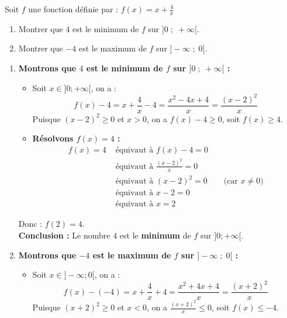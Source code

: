 \documentclass[10pt, a4paper]{article}
\begin{document}
\begin{Application}[][30 min]
Soit $f$ une fonction définie par : \quad $f(x) = x + \frac{4}{x}$
\begin{enumerate}[leftmargin=*,itemsep=0.5pt]
    \item Montrer que $4$ est le minimum de $f$ sur $\big]0 \;;\; +\infty\big[$.
    \item Montrer que $-4$ est le maximum de $f$ sur $\big]-\infty \;;\; 0\big[$.
\end{enumerate}
\end{Application}

\begin{Solution}[APPLICATION][15]
\begin{enumerate}[leftmargin=*,itemsep=1pt]
    \item \textbf{Montrons que $4$ est le minimum de $f$ sur $\big]0 \;;\; +\infty\big[$ :}

    \begin{itemize}[leftmargin=*,itemsep=1pt]
        \item Soit $x \in \big]0 ; +\infty\big[$, on a :
        $$f(x) - 4 = x + \frac{4}{x} - 4 
                 = \frac{x^2 - 4x + 4}{x} 
                 = \frac{(x - 2)^2}{x}$$
    Puisque $(x-2)^2 \geq 0$ et $x > 0$, on a $f(x) - 4 \geq 0$, soit $f(x) \geq 4$.

        \item \textbf{Résolvons $f(x) = 4$ :}
        \begin{align*}
            f(x) = 4
            &\text{ équivaut à } f(x) - 4 = 0 \\
            &\text{ équivaut à } \frac{(x - 2)^2}{x} = 0 \\
            &\text{ équivaut à } (x - 2)^2 = 0 \qquad \text{(car $x \neq 0$)} \\
            &\text{ équivaut à } x - 2 = 0 \\
            &\text{ équivaut à } x = 2
        \end{align*}
    \end{itemize}
    Donc : $f(2) = 4$. \\
    \textbf{Conclusion :} Le nombre $4$ est le \textbf{minimum} de $f$ sur $\big]0 ; +\infty\big[$.

    \item \textbf{Montrons que $-4$ est le maximum de $f$ sur $\big]-\infty \;;\; 0\big[$ :}

    

    \begin{itemize}[leftmargin=*,itemsep=0.5pt]
        \item Soit $x \in \big]-\infty ; 0\big[$, on a :
        $$f(x) - (-4) = x + \frac{4}{x} + 4 
                    = \frac{x^2 + 4x + 4}{x} 
                    = \frac{(x + 2)^2}{x}$$
    Puisque $(x+2)^2 \geq 0$ et $x < 0$, on a $\frac{(x+2)^2}{x} \leq 0$, soit $f(x) \leq -4$.


\end{itemize}
\end{enumerate}
\end{Solution}
\end{document}
